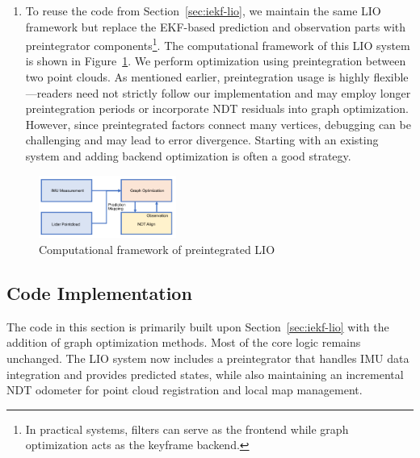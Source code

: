 \begin{enumerate}
	\item To reuse the code from Section~\ref{sec:iekf-lio}, we maintain the same LIO framework but replace the EKF-based prediction and observation parts with preintegrator components\footnote{In practical systems, filters can serve as the frontend while graph optimization acts as the keyframe backend.}. The computational framework of this LIO system is shown in Figure~\ref{fig:framework-lio-preinteg}. We perform optimization using preintegration between two point clouds. As mentioned earlier, preintegration usage is highly flexible—readers need not strictly follow our implementation and may employ longer preintegration periods or incorporate NDT residuals into graph optimization. However, since preintegrated factors connect many vertices, debugging can be challenging and may lead to error divergence. Starting with an existing system and adding backend optimization is often a good strategy.
\end{enumerate}

\begin{figure}[!t]
	\centering
	\includegraphics[width=0.4\textwidth]{resources/lio/lio-preinteg.pdf}
	\caption{Computational framework of preintegrated LIO}
	\label{fig:framework-lio-preinteg}
\end{figure}

\subsection{Code Implementation}  
The code in this section is primarily built upon Section~\ref{sec:iekf-lio} with the addition of graph optimization methods. Most of the core logic remains unchanged. The LIO system now includes a preintegrator that handles IMU data integration and provides predicted states, while also maintaining an incremental NDT odometer for point cloud registration and local map management.

